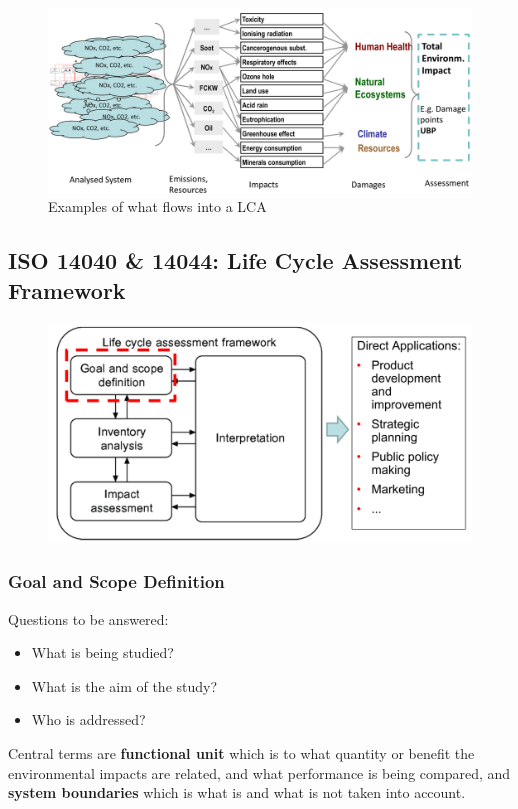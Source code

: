 \documentclass[11pt]{article}
\theoremstyle{definition}
\begin{document}
\begin{figure}[H]
	\centering
	\includegraphics[width=0.8\linewidth]{img/life_cycle_assessment.png}
	\caption{Examples of what flows into a LCA}
\end{figure}

\subsection{ISO 14040 \& 14044: Life Cycle Assessment Framework}
\begin{figure}[tbh]
	\centering
	\includegraphics[width=0.8\linewidth]{img/iso_life_cycle_assessment}
\end{figure}

\subsubsection{Goal and Scope Definition}
Questions to be answered:
\begin{itemize}
	\item What is being studied?
	\item What is the aim of the study?
	\item Who is addressed?
\end{itemize}

Central terms are \textbf{functional unit} which is to what quantity or benefit the environmental impacts are related, and what performance is being compared, and \textbf{system boundaries} which is what is and what is not taken into account.
\end{document}
